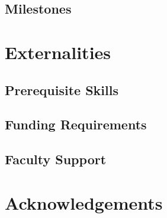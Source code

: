 \documentclass[conference]{IEEEtran} %
\begin{document}
\subsection{Milestones}
\label{subsec:milestones}

\section{Externalities}
\subsection{Prerequisite Skills}

\subsection{Funding Requirements}

\subsection{Faculty Support}


\section*{Acknowledgements}


% 

\onecolumn
\appendices{}
\end{document}

